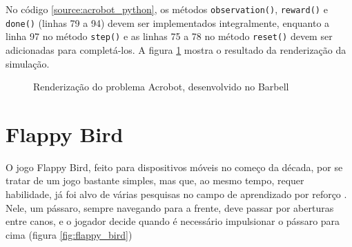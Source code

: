 \documentclass[cic,tc]{iiufrgs}
\begin{document}
No código \ref{source:acrobot_python}, os métodos \texttt{observation()},
\texttt{reward()} e \texttt{done()} (linhas 79 a 94) devem ser implementados
integralmente, enquanto a linha 97 no método \texttt{step()} e as linhas 75 a 78
no método \texttt{reset()} devem ser adicionadas para completá-los. A figura
\ref{fig:acrobot_barbell} mostra o resultado da renderização da simulação.

\begin{figure}[h]
  \begin{center}
  \caption{Renderização do problema Acrobot, desenvolvido no Barbell}
  \label{fig:acrobot_barbell}
\end{center}
\end{figure}

\section{Flappy Bird}
O jogo Flappy Bird, feito para dispositivos móveis no começo da década, por se
tratar de um jogo bastante simples, mas que, ao mesmo tempo, requer habilidade,
já foi alvo de várias pesquisas no campo de aprendizado por reforço \cite{FlappyBird1,FlappyBird2,FlappyBird3}.
Nele, um pássaro, sempre navegando para a frente, deve passar por aberturas entre
canos, e o jogador decide quando é necessário impulsionar o pássaro para cima (figura \ref{fig:flappy_bird})
\end{document}
